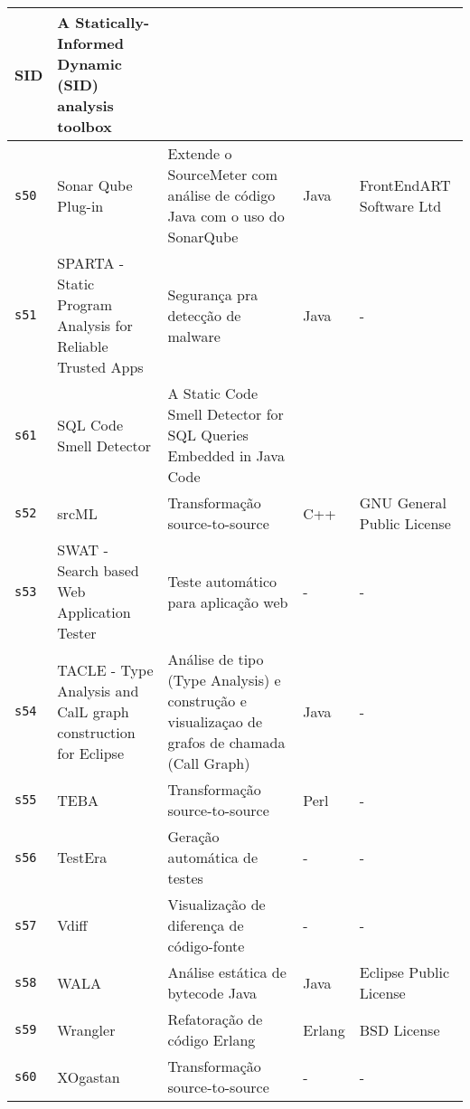 \begin{longtable}{| l | p{4.5cm} | p{7cm} | p{2.5cm} | p{2.5cm} |}
      SID &
      A Statically-Informed Dynamic (SID) analysis toolbox &
       &
       \\
    \hline
    \texttt{s50} &
      Sonar Qube Plug-in &
      Extende o SourceMeter com análise de código Java com o uso do SonarQube &
      Java &
      FrontEndART Software Ltd \\
    \hline
    \texttt{s51} &
      SPARTA - Static Program Analysis for Reliable Trusted Apps &
      Segurança pra detecção de malware &
      Java &
      - \\
    \hline
    \texttt{s61} &
      SQL Code Smell Detector &
      A Static Code Smell Detector for SQL Queries Embedded in Java Code &
       &
       \\
    \hline
    \texttt{s52} &
      srcML &
      Transformação source-to-source &
      C++ &
      GNU General Public License \\
    \hline
    \texttt{s53} &
      SWAT - Search based Web Application Tester &
      Teste automático para aplicação web &
      - &
      - \\
    \hline
    \texttt{s54} &
      TACLE - Type Analysis and CalL graph construction for Eclipse &
      Análise de tipo (Type Analysis) e construção e visualizaçao de grafos de chamada (Call Graph) &
      Java &
      - \\
    \hline
    \texttt{s55} &
      TEBA &
      Transformação source-to-source &
      Perl &
      - \\
    \hline
    \texttt{s56} &
      TestEra &
      Geração automática de testes &
      - &
      - \\
    \hline
    \texttt{s57} &
      Vdiff &
      Visualização de diferença de código-fonte &
      - &
      - \\
    \hline
    \texttt{s58} &
      WALA &
      Análise estática de bytecode Java &
      Java &
      Eclipse Public License \\
    \hline
    \texttt{s59} &
      Wrangler &
      Refatoração de código Erlang &
      Erlang &
      BSD License \\
    \hline
    \texttt{s60} &
      XOgastan &
      Transformação source-to-source &
      - &
      - \\
    \hline
  \hline
\end{longtable}
